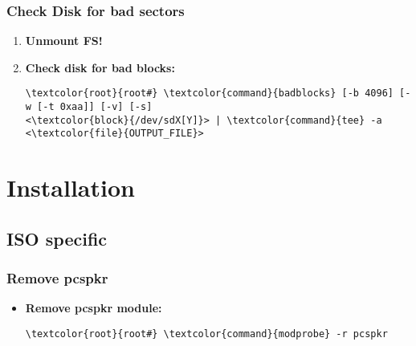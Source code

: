 \documentclass[10pt, a4paper, onecolumn, openany]{book} %
\begin{document}
\subsection{Check Disk for bad sectors}
\begin{enumerate}
    \item \textbf{Unmount FS!}
    \item \textbf{Check disk for bad blocks:}
\begin{Verbatim}[commandchars=\\\{\}]
\textcolor{root}{root#} \textcolor{command}{badblocks} [-b 4096] [-w [-t 0xaa]] [-v] [-s] 
<\textcolor{block}{/dev/sdX[Y]}> | \textcolor{command}{tee} -a <\textcolor{file}{OUTPUT_FILE}>
\end{Verbatim}
\end{enumerate}

\chapter{Installation}
\section{ISO specific}
\subsection{Remove pcspkr}
\begin{itemize}
    \item \textbf{Remove pcspkr module:}
\begin{Verbatim}[commandchars=\\\{\}]
\textcolor{root}{root#} \textcolor{command}{modprobe} -r pcspkr
\end{Verbatim}
\end{itemize}
\end{document}
